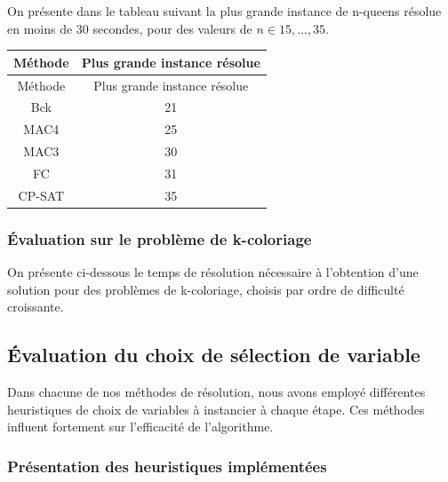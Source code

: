 \documentclass[14pt]{article}
\begin{document}
On présente dans le tableau suivant la plus grande instance de n-queens résolue en moins de 30 secondes, pour des valeurs de $n \in {15,\dots,35}$.

\begin{longtable}{|c|c|}
	\hline
	Méthode & Plus grande instance résolue \\
	\hline
	\endfirsthead

	Méthode & Plus grande instance résolue \\
	\hline
	\endhead

	\hline
	\endfoot

	\hline
	\endlastfoot

	Bck     & 21                           \\
	MAC4    & 25                           \\
	MAC3    & 30                           \\
	FC      & 31                           \\
	CP-SAT  & 35                           \\
\end{longtable}


\subsubsection{Évaluation sur le problème de k-coloriage}

On présente ci-dessous le temps de résolution nécessaire à l'obtention d'une solution pour des problèmes de k-coloriage, choisis par ordre de difficulté croissante.

\subsection{Évaluation du choix de sélection de variable}

Dans chacune de nos méthodes de résolution, nous avons employé différentes heuristiques de choix de variables à instancier à chaque étape. Ces méthodes influent fortement sur l'efficacité de l'algorithme.

\subsubsection{Présentation des heuristiques implémentées}
\end{document}
